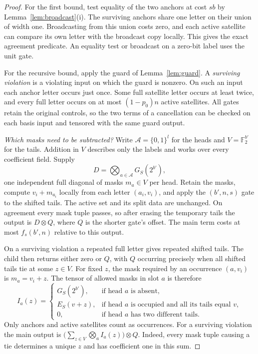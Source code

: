 \begin{proof}
For the first bound, test equality of the two anchors at cost \(s b\)
by Lemma~\ref{lem:broadcast}(i). The surviving anchors share one
letter on their union of width one. Broadcasting from this union
costs zero, and each active satellite can compare its own letter with
the broadcast copy locally. This gives the exact agreement predicate.
An equality test or broadcast on a zero-bit label uses the unit gate.

For the recursive bound, apply the guard of Lemma~\ref{lem:guard}.
A \emph{surviving violation} is a violating input on which the guard
is nonzero. On such an input each anchor letter occurs just once.
Some full satellite letter occurs at least twice, and every full
letter occurs on at most \((1-p_0)n\) active satellites. All gates
retain the original controls, so the two terms of a cancellation can
be checked on each basis input and tensored with the same guard output.

\smallskip\noindent\emph{Which masks need to be subtracted?}
Write \(\mathcal A=\{0,1\}^l\) for the heads and \(V=\mathbb F_2^{b'}\)
for the tails. Addition in \(V\) describes only the labels and works
over every coefficient field. Supply
\[
                   D=\bigotimes_{a\in\mathcal A}G_S(2^{b'}),
\]
one independent full diagonal of masks \(m_a\in V\) per head. Retain
the masks, compute \(v_i+m_{a_i}\) locally from each letter
\((a_i,v_i)\), and apply the \((b',n,s)\) gate to the shifted
tails. The active set and its split data are unchanged. On agreement
every mask tuple passes, so after erasing the temporary tails the
output is \(D\otimes Q\), where \(Q\) is the shorter gate's offset.
The main term costs at most \(f_s(b',n)\) relative to this output.

On a surviving violation a repeated full letter gives repeated shifted
tails. The child then returns either zero or \(Q\), with \(Q\) occurring
precisely when all shifted tails tie at some \(z\in V\). For fixed \(z\),
the mask required by an occurrence \((a,v_i)\) is \(m_a=v_i+z\).
The tensor of allowed masks in slot \(a\) is therefore
\begin{equation}\label{eq:mask-check}
 I_a(z)=
 \begin{cases}
 G_S(2^{b'}), & \text{if head \(a\) is absent},\\
 E_S(v+z),    & \text{if head \(a\) is occupied and all its tails equal \(v\)},\\
 0,           & \text{if head \(a\) has two different tails}.
 \end{cases}
\end{equation}
Only anchors and active satellites count as occurrences. For a surviving
violation the main output is
\(\big(\sum_{z\in V}\bigotimes_a I_a(z)\big)\otimes Q\).
Indeed, every mask tuple causing a tie determines a unique \(z\) and
has coefficient one in this sum.


\end{proof}
